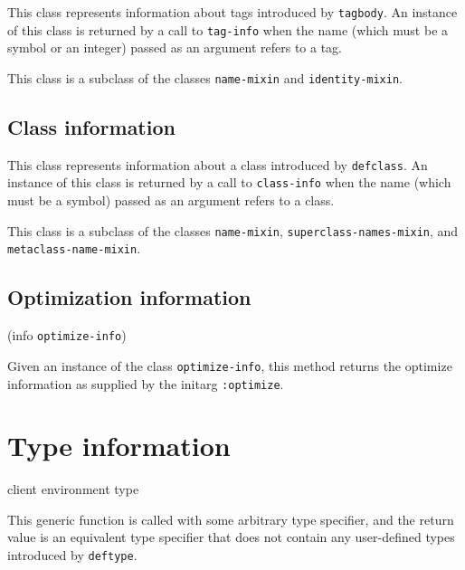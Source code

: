 
This class represents information about tags introduced by
\texttt{tagbody}.  An instance of this class is returned by a call to
\texttt{tag-info} when the name (which must be a symbol or an integer)
passed as an argument refers to a tag.

This class is a subclass of the classes \texttt{name-mixin} and
\texttt{identity-mixin}.

\subsection{Class information}


This class represents information about a class introduced by
\texttt{defclass}.  An instance of this class is returned by a call to
\texttt{class-info} when the name (which must be a symbol)
passed as an argument refers to a class.

This class is a subclass of the classes \texttt{name-mixin},
\texttt{superclass-names-mixin},  and
\texttt{metaclass-name-mixin}.

\subsection{Optimization information}


 {(info {\tt optimize-info})}

Given an instance of the class \texttt{optimize-info}, this method
returns the optimize information as supplied by the initarg
\texttt{:optimize}.

\section{Type information}

 {client environment type}

This generic function is called with some arbitrary type specifier,
and the return value is an equivalent type specifier that does not
contain any user-defined types introduced by \texttt{deftype}.
